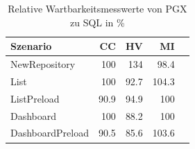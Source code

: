 \begin{table}[ht]
\centering
\caption{Relative Wartbarkeitsmesswerte von PGX zu SQL in \%}
\begin{tabular}{lrrrr}
\toprule
Szenario & CC & HV & MI \\
\midrule
	NewRepository &  100 & \cellcolor{red!24}  134 &  98.4 \\
	List &  100 & \cellcolor{green!13}  92.7 & \cellcolor{green!12}  104.3 \\
	ListPreload & \cellcolor{green!14}  90.9 & \cellcolor{green!12}  94.9 &  100 \\
	Dashboard &  100 & \cellcolor{green!15}  88.2 &  100 \\
	DashboardPreload & \cellcolor{green!14}  90.5 & \cellcolor{green!16}  85.6 & \cellcolor{green!11}  103.6 \\
\bottomrule
\end{tabular}
\label{tab:wartbarkeit_relativ_pgx}
\end{table}
	